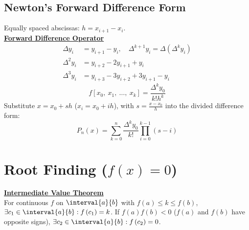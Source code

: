 \documentclass{article}
\begin{document}
\begin{multicols}{3}
    \subsection{Newton's Forward Difference Form}
    Equally spaced abscissas: \(h =  x_{i + 1} - x_i\). \\
    \underline{\textbf{Forward Difference Operator}}
    \begin{align*}
        \Delta y_i   & = y_{i + 1} - y_i, \quad \Delta^{k + 1} y_i = \Delta \left( \Delta^k y_i \right) \\
        \Delta^2 y_i & = y_{i + 2} - 2y_{i + 1} + y_i                                                   \\
        \Delta^3 y_i & = y_{i + 3} - 3y_{i + 2} + 3y_{i + 1} - y_i
    \end{align*}
    \begin{equation*}
        f\left[ x_0,\: x_1,\: \dots,\: x_k \right] = \frac{\Delta^k y_0}{k! h^k}
    \end{equation*}
    Substitute \(x = x_0 + s h\) (\(x_i = x_0 + i h\)), with \(s = \frac{x - x_0}{h}\) into the divided difference form:
    \begin{equation*}
        P_n\left( x \right) = \sum_{k = 0}^n \frac{\Delta^k y_0}{k!} \prod_{i = 0}^{k - 1} \left( s - i \right)
    \end{equation*}
    \section{Root Finding (\texorpdfstring{\(f\left( x \right) = 0\)}{f(x) = 0})}
    \underline{\textbf{Intermediate Value Theorem}} \\
    For continuous \(f\) on \(\interval{a}{b}\) with \(f\left( a \right) \leq k \leq f\left( b \right)\),
    \(\exists c_1 \in \interval{a}{b} : f\left( c_1 \right) = k\).
    If \(f\left( a \right) f\left( b \right) < 0\) (\(f\left( a \right)\) and \(f\left( b \right)\) have opposite signs),
    \(\exists c_2 \in \interval{a}{b} : f\left( c_2 \right) = 0\).

\end{multicols}
\end{document}
